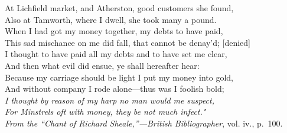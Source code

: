 \begin{scverse}
At Lichfield market, and Atherston, good customers she found,\\
Also at Tamworth, where I dwell, she took many a pound.\\
When I had got my money together, my debts to have paid,\\
This sad mischance on me did fall, that cannot be denay’d; [denied]\\
I thought to have paid all my debts and to have set me clear,\\
And then what evil did ensue, ye shall hereafter hear:\\
Because my carriage should be light I put my money into gold,\\
And without company I rode alone—thus was I foolish bold;\\
\textit{I thought by reason of my harp no man would me suspect,\\
For Minstrels oft with money, they be not much infect."\\
\hfill From the “Chant of Richard Sheale,”—British Bibliographer}, vol. iv., p.~100. 
\end{scverse}
\pagebreak